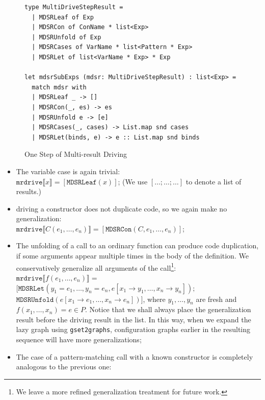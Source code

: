 \documentclass[submission,copyright,creativecommons]{eptcs}
\begin{document}
\begin{figure}
\begin{lstlisting}
type MultiDriveStepResult =
  | MDSRLeaf of Exp
  | MDSRCon of ConName * list<Exp>
  | MDSRUnfold of Exp
  | MDSRCases of VarName * list<Pattern * Exp>
  | MDSRLet of list<VarName * Exp> * Exp

let mdsrSubExps (mdsr: MultiDriveStepResult) : list<Exp> =
  match mdsr with
  | MDSRLeaf _ -> []
  | MDSRCon(_, es) -> es
  | MDSRUnfold e -> [e]
  | MDSRCases(_, cases) -> List.map snd cases
  | MDSRLet(binds, e) -> e :: List.map snd binds
\end{lstlisting}
\caption{One Step of Multi-result Driving}
\label{fig:MultiDriveStepResult}
\end{figure}

\begin{itemize}
  \item The variable case is again trivial: \\
    $\mathtt{mrdrive} \llbracket x \rrbracket = [\mathtt{MDSRLeaf}(x)]$;
    (We use $[\ldots; \ldots; \ldots]$ to denote a list of results.)
  \item driving a constructor does not duplicate code, so we again make no generalization: \\ 
    $\mathtt{mrdrive} \llbracket C(e_1, \ldots, e_n) \rrbracket = [\mathtt{MDSRCon}(C, e_1, \ldots, e_n)]$;
  \item The unfolding of a call to an ordinary function can produce code duplication, if some arguments appear
    multiple times in the body of the definition. 
    We conservatively generalize all arguments of the call\footnote{We leave a more refined generalization treatment for future work.}: \\
    $\mathtt{mrdrive} \llbracket f(e_1, \ldots, e_n) \rrbracket =$ 
      $[\mathtt{MDSRLet}(y_1=e_1, \ldots, y_n=e_n, e [ x_1\rightarrow y_1, \ldots, x_n\rightarrow y_n ]); $ \\
      $\mathtt{MDSRUnfold}(e [ x_1\rightarrow e_1, \ldots, x_n\rightarrow e_n ])]$,
    where $y_1, \ldots, y_n$ are fresh and $f(x_1, \ldots, x_n) = e \in P$.
    Notice that we shall always place the generalization result before the driving result in the list.
    In this way, when we expand the lazy graph using \verb|gset2graphs|, configuration graphs
    earlier in the resulting sequence will have more generalizations;
  \item The case of a pattern-matching call with a known constructor is completely
    analogous to the previous one: \\

\end{itemize}
\end{document}
